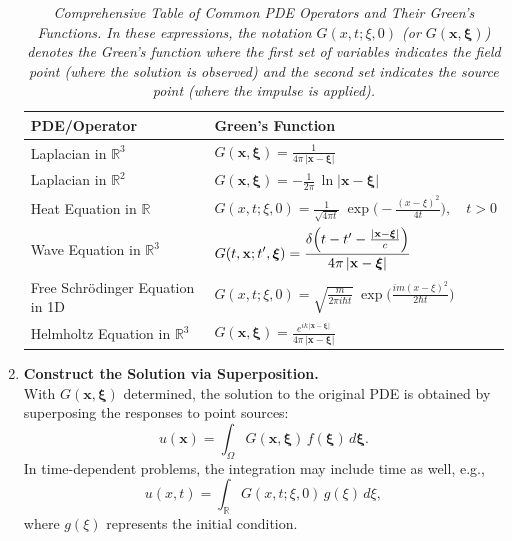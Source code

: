 \begin{enumerate}
\bigskip

\begin{table}[H]
\centering
\caption{\textit{Comprehensive Table of Common PDE Operators and Their Green's Functions. In these expressions, the notation \(G(x,t;\xi,0)\) (or \(G(\mathbf{x},\boldsymbol{\xi})\)) denotes the Green's function where the first set of variables indicates the field point (where the solution is observed) and the second set indicates the source point (where the impulse is applied).}}
\begin{tabular}{|>{\centering\arraybackslash}m{}|>{\centering\arraybackslash}m{}|}
\hline
\textbf{PDE/Operator} & \textbf{Green's Function} \\
\hline
\rule{0pt}{6ex}
Laplacian in \(\mathbb{R}^3\) &
\(\displaystyle G(\mathbf{x},\boldsymbol{\xi}) = \frac{1}{4\pi\,\lvert \mathbf{x} - \boldsymbol{\xi} \rvert}\) \\[3ex]
\hline
\rule{0pt}{6ex}
Laplacian in \(\mathbb{R}^2\) &
\(\displaystyle G(\mathbf{x},\boldsymbol{\xi}) = -\frac{1}{2\pi}\,\ln \lvert \mathbf{x} - \boldsymbol{\xi} \rvert\) \\[3ex]
\hline
\rule{0pt}{6ex}
Heat Equation in \(\mathbb{R}\) &
\(\displaystyle G(x,t;\xi,0)=\frac{1}{\sqrt{4\pi t}}\;\exp\!\Biggl(-\frac{(x-\xi)^2}{4t}\Biggr),\quad t>0\) \\[5ex]
\hline
\rule{0pt}{6ex}
Wave Equation in \(\mathbb{R}^3\) &
\(\displaystyle G(t,\mathbf{x};t',\boldsymbol{\xi}) = \frac{\delta\Bigl(t-t'-\frac{\lvert \mathbf{x} - \boldsymbol{\xi} \rvert}{c}\Bigr)}{4\pi\,\lvert \mathbf{x} - \boldsymbol{\xi} \rvert}\) \\[5ex]
\hline
\rule{0pt}{6ex}
Free Schrödinger Equation in 1D &
\(\displaystyle G(x,t;\xi,0)=\sqrt{\frac{m}{2\pi i\hbar t}}\;\exp\Biggl(\frac{i m (x-\xi)^2}{2\hbar t}\Biggr)\) \\[5ex]
\hline
\rule{0pt}{6ex}
Helmholtz Equation in \(\mathbb{R}^3\) &
\(\displaystyle G(\mathbf{x},\boldsymbol{\xi}) = \frac{e^{ik\,\lvert \mathbf{x} - \boldsymbol{\xi} \rvert}}{4\pi\,\lvert \mathbf{x} - \boldsymbol{\xi} \rvert}\) \\[5ex]
\hline
\end{tabular}
\label{table:greens_functions}
\end{table}
    
    
    \item \textbf{Construct the Solution via Superposition.}\\[1mm]
    With \(G(\mathbf{x},\boldsymbol{\xi})\) determined, the solution to the original PDE is obtained by superposing the responses to point sources:
    \[
    u(\mathbf{x}) = \int_{\Omega} G(\mathbf{x},\boldsymbol{\xi})\,f(\boldsymbol{\xi})\,d\boldsymbol{\xi}.
    \]
    In time-dependent problems, the integration may include time as well, e.g.,
    \[
    u(x,t) = \int_{\mathbb{R}} G(x,t;\xi,0)\,g(\xi)\,d\xi,
    \]
    where \(g(\xi)\) represents the initial condition.
    

\end{enumerate}
